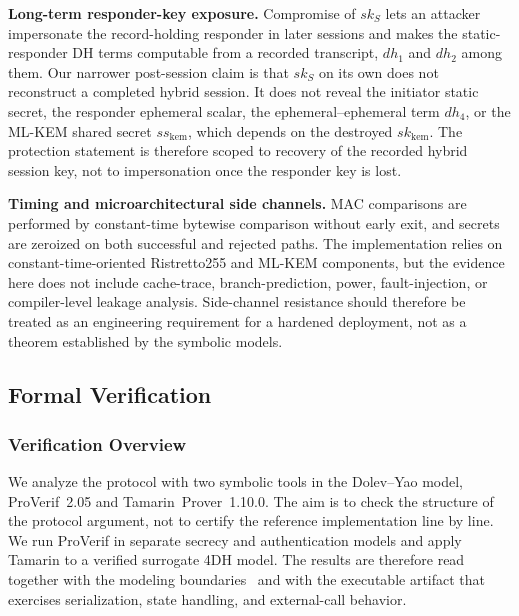 \documentclass{ieeeijc}
\theoremstyle{remark}
\begin{document}
\textbf{Long-term responder-key exposure.} Compromise of $sk_S$ lets an attacker impersonate the record-holding responder in later sessions and makes the static-responder DH terms computable from a recorded transcript, $dh_1$ and $dh_2$ among them. Our narrower post-session claim is that $sk_S$ on its own does not reconstruct a completed hybrid session. It does not reveal the initiator static secret, the responder ephemeral scalar, the ephemeral--ephemeral term $dh_4$, or the ML-KEM shared secret $ss_{\mathrm{kem}}$, which depends on the destroyed $sk_{\mathrm{kem}}$. The protection statement is therefore scoped to recovery of the recorded hybrid session key, not to impersonation once the responder key is lost.

\textbf{Timing and microarchitectural side channels.} MAC comparisons
are performed by constant-time bytewise comparison without early exit,
and secrets are zeroized on both successful and rejected paths. The
implementation relies on constant-time-oriented Ristretto255 and ML-KEM
components, but the evidence here does not include cache-trace,
branch-prediction, power, fault-injection, or compiler-level leakage
analysis. Side-channel resistance should therefore be treated as an
engineering requirement for a hardened deployment, not as a theorem
established by the symbolic models.

\subsection{Formal Verification}

\subsubsection{Verification Overview}

We analyze the protocol with two symbolic tools in the Dolev--Yao model, ProVerif~2.05 and Tamarin~Prover~1.10.0. The aim is to check the structure of the protocol argument, not to certify the reference implementation line by line. We run ProVerif in separate secrecy and authentication models and apply Tamarin to a verified surrogate 4DH model. The results are therefore read together with the modeling boundaries~\cite{cremers2012,basin2018} and with the executable artifact that exercises serialization, state handling, and external-call behavior.
\end{document}

